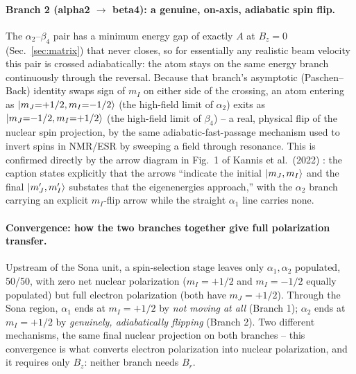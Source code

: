 \documentclass[11pt,a4paper]{article}
\begin{document}
\paragraph{Branch 2 (alpha2 $\to$ beta4): a genuine, on-axis, adiabatic spin
flip.} The $\alpha_2$--$\beta_4$ pair has a minimum energy gap of exactly
$A$ at $B_z=0$ (Sec.~\ref{sec:matrix}) that never closes, so for essentially
any realistic beam velocity this pair is crossed adiabatically: the atom
stays on the same energy branch continuously through the reversal. Because
that branch's asymptotic (Paschen--Back) identity swaps sign of $m_I$ on
either side of the crossing, an atom entering as $\ket{m_J{=}{+}1/2,m_I{=}{-}1/2}$
(the high-field limit of $\alpha_2$) exits as $\ket{m_J{=}{-}1/2,m_I{=}{+}1/2}$
(the high-field limit of $\beta_4$) -- a real, physical flip of the nuclear
spin projection, by the same adiabatic-fast-passage mechanism used to invert
spins in NMR/ESR by sweeping a field through resonance. This is confirmed
directly by the arrow diagram in Fig.~1 of Kannis et al.\ (2022)
\cite{kannis2022spin}: the caption states explicitly that the arrows
``indicate the initial $\ket{m_J,m_I}$ and the final $\ket{m_J',m_I'}$
substates that the eigenenergies approach,'' with the $\alpha_2$ branch
carrying an explicit $m_I$-flip arrow while the straight $\alpha_1$ line
carries none.

\paragraph{Convergence: how the two branches together give full polarization
transfer.} Upstream of the Sona unit, a spin-selection stage leaves only
$\alpha_1,\alpha_2$ populated, 50/50, with zero net nuclear polarization
($m_I=+1/2$ and $m_I=-1/2$ equally populated) but full electron polarization
(both have $m_J=+1/2$). Through the Sona region, $\alpha_1$ ends at
$m_I=+1/2$ by \emph{not moving at all} (Branch 1); $\alpha_2$ ends at
$m_I=+1/2$ by \emph{genuinely, adiabatically flipping} (Branch 2). Two
different mechanisms, the same final nuclear projection on both branches --
this convergence is what converts electron polarization into nuclear
polarization, and it requires only $B_z$: neither branch needs $B_r$.
\end{document}
